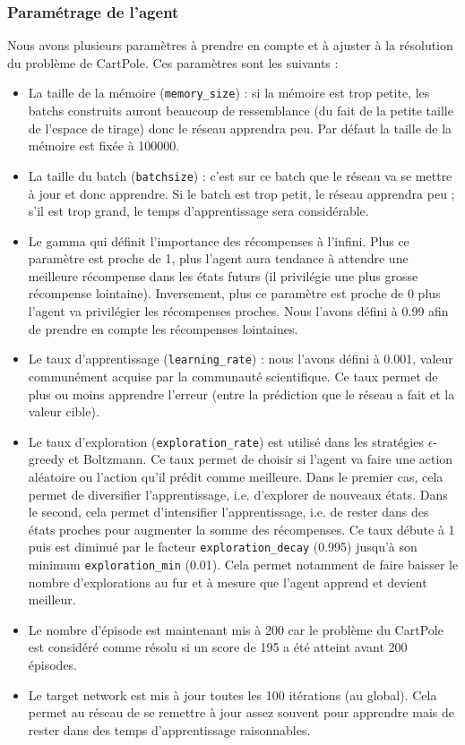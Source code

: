 \documentclass[10pt,a4paper]{article}
\begin{document}
\subsubsection{Paramétrage de l'agent} \label{paramDQN}
Nous avons plusieurs paramètres à prendre en compte et à ajuster à la résolution du problème de CartPole. Ces paramètres sont les suivants : 
\begin{itemize}
	\item La taille de la mémoire (\lstinline{memory_size}) : si la mémoire est trop petite, les batchs construits auront beaucoup de ressemblance (du fait de la petite taille de l'espace de tirage) donc le réseau apprendra peu. Par défaut la taille de la mémoire est fixée à 100000.
    \item La taille du batch (\lstinline{batchsize}) : c'est sur ce batch que le réseau va se mettre à jour et donc apprendre. Si le batch est trop petit, le réseau apprendra peu ; s'il est trop grand, le temps d'apprentissage sera considérable.
    \item Le gamma qui définit l'importance des récompenses à l'infini. Plus ce paramètre est proche de 1, plus l'agent aura tendance à attendre une meilleure récompense dans les états futurs (il privilégie une plus grosse récompense lointaine). Inversement, plus ce paramètre est proche de 0 plus l'agent va privilégier les récompenses proches. Nous l'avons défini à 0.99 afin de prendre en compte les récompenses lointaines.
    \item Le taux d'apprentissage (\lstinline{learning_rate}) : nous l'avons défini à 0.001, valeur communément acquise par la communauté scientifique. Ce taux permet de plus ou moins apprendre l'erreur (entre la prédiction que le réseau a fait et la valeur cible).
    \item Le taux d'exploration (\lstinline{exploration_rate}) est utilisé dans les stratégies $\epsilon$-greedy et Boltzmann. Ce taux permet de choisir si l'agent va faire une action aléatoire ou l'action qu'il prédit comme meilleure. Dans le premier cas, cela permet de diversifier l'apprentissage, i.e. d'explorer de nouveaux états. Dans le second, cela permet d'intensifier l'apprentissage, i.e. de rester dans des états proches pour augmenter la somme des récompenses. Ce taux débute à 1 puis est diminué par le facteur \lstinline{exploration_decay} (0.995) jusqu'à son minimum \lstinline{exploration_min} (0.01). Cela permet notamment de faire baisser le nombre d'explorations au fur et à mesure que l'agent apprend et devient meilleur.
    \item Le nombre d'épisode est maintenant mis à 200 car le problème du CartPole est considéré comme résolu si un score de 195 a été atteint avant 200 épisodes.
    \item Le target network est mis à jour toutes les 100 itérations (au global). Cela permet au réseau de se remettre à jour assez souvent pour apprendre mais de rester dans des temps d'apprentissage raisonnables.
\end{itemize}
\end{document}

